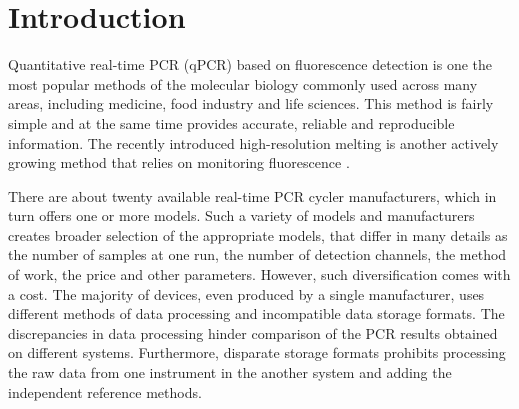 \documentclass{bioinfo}
\begin{document}
	\section{Introduction}
	
	Quantitative real-time PCR (qPCR) based on fluorescence detection is one the
	most popular methods of the molecular biology commonly used across many areas,
	including medicine, food industry  and life sciences. This method is fairly
	simple and at the same time provides accurate, reliable and reproducible
	information\cite{kubista_real-time_2006}. The recently introduced
	high-resolution melting is another actively growing method that relies on
	monitoring fluorescence
	\cite{reed_high-resolution_2007}\cite{wittwer_high-resolution_2009}.
	
	There are about twenty available real-time PCR cycler manufacturers, which in
	turn offers one or more models. Such a variety of models and manufacturers
	creates broader selection of the appropriate models, that differ in many details
	as the number of samples at one run, the number of detection channels, the
	method of work, the price and other parameters. However, such diversification
	comes with a cost. The majority of devices, even produced by a single
	manufacturer, uses different methods of data processing and incompatible data
	storage formats. The discrepancies in data processing hinder comparison of the
	PCR results obtained on different systems. Furthermore, disparate storage
	formats prohibits processing the raw data from one instrument in the another
	system and adding the independent reference methods.
	
\end{document}

